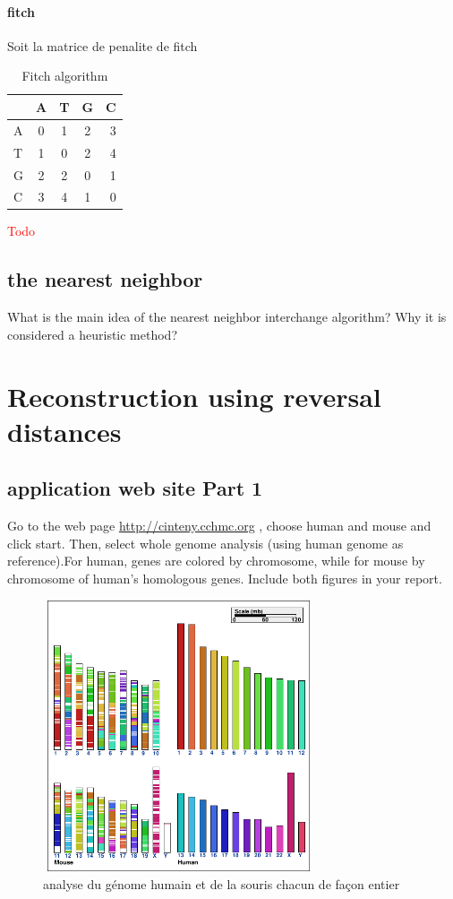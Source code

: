 \paragraph{fitch}

Soit la matrice de penalite de fitch \\
\begin{table}[!h]
  \centering
\begin{tabular}{|l|c|c|c|r|}
\hline
    & A & T & G & C \\
  \hline
  A  & 0 & 1 & 2 & 3 \\
	\hline
	T  & 1 & 0 & 2 & 4 \\
	\hline
  G  & 2 & 2 & 0 & 1 \\
  \hline
  C  & 3 & 4 & 1 & 0 \\
  \hline
\end{tabular}
	\caption{Fitch algorithm}
	\label{tab:commands}
\end{table}
\textcolor{red}{Todo}
\subsection{the nearest neighbor}

 What is the main idea of the nearest neighbor interchange algorithm?  Why it is
considered a heuristic method?

\section{Reconstruction using reversal distances}

\subsection{application web site Part 1}
Go to the web page \url{http://cinteny.cchmc.org} , choose human and mouse and click start. Then, select whole genome analysis (using human genome as reference).For human, genes are colored by chromosome, while for mouse by chromosome of human's homologous genes.  Include both figures in your report.

\begin{figure}[!h]
\includegraphics[width=8cm,height=8cm]{imag/graph1}
\caption{analyse du g\'{e}nome humain et de la souris chacun de fa\c{c}on entier }
\end{figure}

